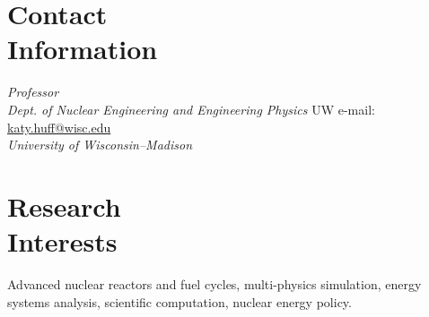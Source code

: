 \documentclass[margin,line]{resume}
\begin{document}
\begin{resume}

%


    \section{\mysidestyle Contact\\Information}
        \textsl{Professor}
        \\\vspace{0mm}%
        \textsl{Dept. of Nuclear Engineering and Engineering Physics}
        \hfill UW e-mail: \href{mailto:katy.huff@wsisc.edu}{katy.huff@wisc.edu}       \vspace{0mm}\\\vspace{0mm}%
        \textsl{University of Wisconsin--Madison}

    \section{\mysidestyle Research\\Interests}
                Advanced nuclear reactors and fuel cycles, multi-physics
                simulation, energy systems analysis,
                scientific computation, nuclear energy policy.

\end{resume}
\end{document}
